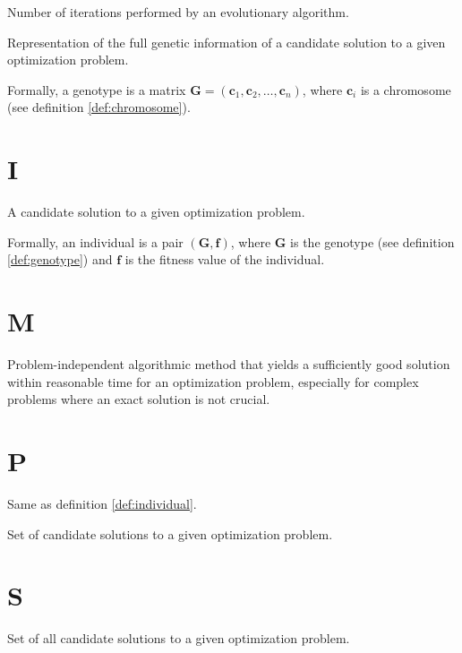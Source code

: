     \begin{definition}[Generation]
    \label{def:generation}
      Number of iterations performed by an evolutionary algorithm.
    \end{definition}

    \begin{definition}[Genotype]
    \label{def:genotype}
      Representation of the full genetic information of a candidate solution to a given optimization
      problem.

      Formally, a genotype is a matrix \(\mathbf{G} = (\textbf{c}_1, \textbf{c}_2, \dots, 
      \textbf{c}_n)\), where \(\textbf{c}_i\) is a chromosome (see definition \ref{def:chromosome}).
    \end{definition}

  \section*{I}
    \begin{definition}[Individual]
    \label{def:individual}
      A candidate solution to a given optimization problem.

      Formally, an individual is a pair \((\mathbf{G}, \mathbf{f})\), where \(\mathbf{G}\) is the
      genotype (see definition \ref{def:genotype}) and \(\mathbf{f}\) is the fitness value of the
      individual.
    \end{definition}

  \section*{M}
    \begin{definition}[Metaheuristics]
    \label{def:metaheuristic}
      Problem-independent algorithmic method that yields a sufficiently good solution within 
      reasonable time for an optimization problem, especially for complex problems where an exact 
      solution is not crucial.
    \end{definition}
  
  \section*{P}
    \begin{definition}[Phenotype]
    \label{def:phenotype}
      Same as definition \ref{def:individual}.
    \end{definition}

    \begin{definition}[Population]
    \label{def:population}
      Set of candidate solutions to a given optimization problem.
    \end{definition}

  \section*{S}
    \begin{definition}
    \label{def:search_space}
      Set of all candidate solutions to a given optimization problem.
    \end{definition}
